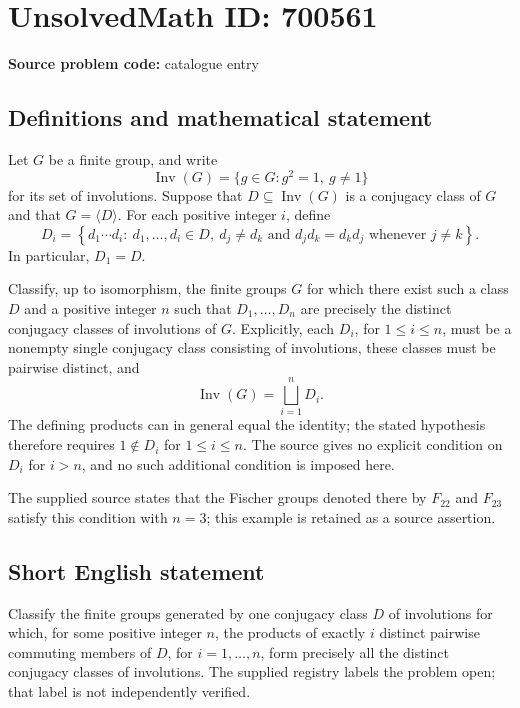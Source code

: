 \documentclass[11pt]{article}
\begin{document}
\section*{UnsolvedMath ID: 700561}
\textbf{Source problem code:} catalogue entry
\subsection{Definitions and mathematical statement}
Let \(G\) be a finite group, and write
\[
\operatorname{Inv}(G)=\{g\in G:g^2=1,\ g\ne 1\}
\]
for its set of involutions. Suppose that \(D\subseteq\operatorname{Inv}(G)\) is a conjugacy class of \(G\) and that \(G=\langle D\rangle\). For each positive integer \(i\), define
\[
D_i=\left\{d_1\cdots d_i:\ d_1,\ldots,d_i\in D,\ d_j\ne d_k\text{ and }d_jd_k=d_kd_j\text{ whenever }j\ne k\right\}.
\]
In particular, \(D_1=D\).

Classify, up to isomorphism, the finite groups \(G\) for which there exist such a class \(D\) and a positive integer \(n\) such that \(D_1,\ldots,D_n\) are precisely the distinct conjugacy classes of involutions of \(G\). Explicitly, each \(D_i\), for \(1\le i\le n\), must be a nonempty single conjugacy class consisting of involutions, these classes must be pairwise distinct, and
\[
\operatorname{Inv}(G)=\bigsqcup_{i=1}^{n}D_i.
\]
The defining products can in general equal the identity; the stated hypothesis therefore requires \(1\notin D_i\) for \(1\le i\le n\). The source gives no explicit condition on \(D_i\) for \(i>n\), and no such additional condition is imposed here.

The supplied source states that the Fischer groups denoted there by \(F_{22}\) and \(F_{23}\) satisfy this condition with \(n=3\); this example is retained as a source assertion.
\subsection{Short English statement}
Classify the finite groups generated by one conjugacy class \(D\) of involutions for which, for some positive integer \(n\), the products of exactly \(i\) distinct pairwise commuting members of \(D\), for \(i=1,\ldots,n\), form precisely all the distinct conjugacy classes of involutions. The supplied registry labels the problem open; that label is not independently verified.
\end{document}
